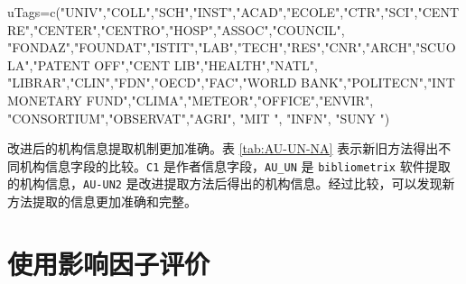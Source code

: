 \documentclass[]{ctexbook}
\newenvironment{Shaded}{\begin{snugshade}}{\end{snugshade}}
\newcommand{\FunctionTok}[1]{\textcolor[rgb]{0.00,0.00,0.00}{#1}}
\newcommand{\NormalTok}[1]{#1}
\newcommand{\OtherTok}[1]{\textcolor[rgb]{0.56,0.35,0.01}{#1}}
\newcommand{\StringTok}[1]{\textcolor[rgb]{0.31,0.60,0.02}{#1}}
\begin{document}
\begin{Shaded}
\begin{Highlighting}[]
\NormalTok{uTags}\OtherTok{=}\FunctionTok{c}\NormalTok{(}\StringTok{"UNIV"}\NormalTok{,}\StringTok{"COLL"}\NormalTok{,}\StringTok{"SCH"}\NormalTok{,}\StringTok{"INST"}\NormalTok{,}\StringTok{"ACAD"}\NormalTok{,}\StringTok{"ECOLE"}\NormalTok{,}\StringTok{"CTR"}\NormalTok{,}\StringTok{"SCI"}\NormalTok{,}\StringTok{"CENTRE"}\NormalTok{,}\StringTok{"CENTER"}\NormalTok{,}\StringTok{"CENTRO"}\NormalTok{,}\StringTok{"HOSP"}\NormalTok{,}\StringTok{"ASSOC"}\NormalTok{,}\StringTok{"COUNCIL"}\NormalTok{,}
          \StringTok{"FONDAZ"}\NormalTok{,}\StringTok{"FOUNDAT"}\NormalTok{,}\StringTok{"ISTIT"}\NormalTok{,}\StringTok{"LAB"}\NormalTok{,}\StringTok{"TECH"}\NormalTok{,}\StringTok{"RES"}\NormalTok{,}\StringTok{"CNR"}\NormalTok{,}\StringTok{"ARCH"}\NormalTok{,}\StringTok{"SCUOLA"}\NormalTok{,}\StringTok{"PATENT OFF"}\NormalTok{,}\StringTok{"CENT LIB"}\NormalTok{,}\StringTok{"HEALTH"}\NormalTok{,}\StringTok{"NATL"}\NormalTok{,}
          \StringTok{"LIBRAR"}\NormalTok{,}\StringTok{"CLIN"}\NormalTok{,}\StringTok{"FDN"}\NormalTok{,}\StringTok{"OECD"}\NormalTok{,}\StringTok{"FAC"}\NormalTok{,}\StringTok{"WORLD BANK"}\NormalTok{,}\StringTok{"POLITECN"}\NormalTok{,}\StringTok{"INT MONETARY FUND"}\NormalTok{,}\StringTok{"CLIMA"}\NormalTok{,}\StringTok{"METEOR"}\NormalTok{,}\StringTok{"OFFICE"}\NormalTok{,}\StringTok{"ENVIR"}\NormalTok{,}
          \StringTok{"CONSORTIUM"}\NormalTok{,}\StringTok{"OBSERVAT"}\NormalTok{,}\StringTok{"AGRI"}\NormalTok{, }\StringTok{"MIT "}\NormalTok{, }\StringTok{"INFN"}\NormalTok{, }\StringTok{"SUNY "}\NormalTok{)}
\end{Highlighting}
\end{Shaded}

改进后的机构信息提取机制更加准确。表 \ref{tab:AU-UN-NA} 表示新旧方法得出不同机构信息字段的比较。\texttt{C1} 是作者信息字段，\texttt{AU\_UN} 是 \texttt{bibliometrix} 软件提取的机构信息，\texttt{AU-UN2} 是改进提取方法后得出的机构信息。经过比较，可以发现新方法提取的信息更加准确和完整。

\hypertarget{htmlwidget-2fbfabb539218dcff04b}{}

\hypertarget{htmlwidget-3326fa9854eb6abe80c4}{}

\hypertarget{impact-factor}{%
\chapter{使用影响因子评价}\label{impact-factor}}
\end{document}
